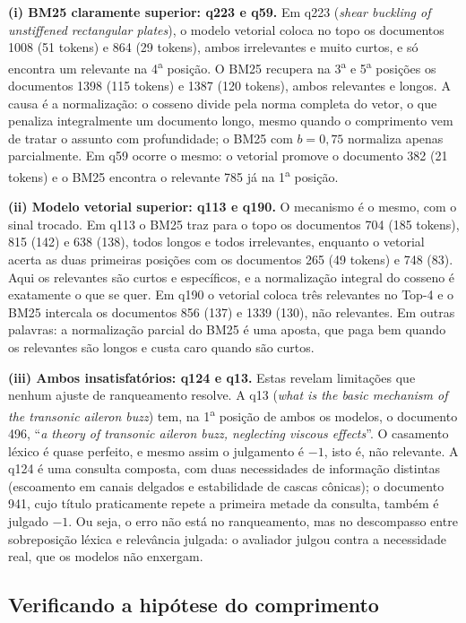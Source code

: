\documentclass[10pt,twocolumn,a4paper]{article}
\begin{document}
\textbf{(i) BM25 claramente superior: q223 e q59.} Em q223 (\textit{shear
buckling of unstiffened rectangular plates}), o modelo vetorial coloca no topo os
documentos 1008 (51 tokens) e 864 (29 tokens), ambos irrelevantes e muito
curtos, e só encontra um relevante na 4\textsuperscript{a} posição. O BM25
recupera na 3\textsuperscript{a} e 5\textsuperscript{a} posições os documentos
1398 (115 tokens) e 1387 (120 tokens), ambos relevantes e longos. A causa é a
normalização: o cosseno divide pela norma completa do vetor, o que penaliza
integralmente um documento longo, mesmo quando o comprimento vem de tratar o
assunto com profundidade; o BM25 com $b = 0{,}75$ normaliza apenas parcialmente.
Em q59 ocorre o mesmo: o vetorial promove o documento 382 (21 tokens) e o BM25
encontra o relevante 785 já na 1\textsuperscript{a} posição.

\textbf{(ii) Modelo vetorial superior: q113 e q190.} O mecanismo é o mesmo, com
o sinal trocado. Em q113 o BM25 traz para o topo os documentos 704 (185 tokens),
815 (142) e 638 (138), todos longos e todos irrelevantes, enquanto o vetorial
acerta as duas primeiras posições com os documentos 265 (49 tokens) e 748 (83).
Aqui os relevantes são curtos e específicos, e a normalização integral do cosseno
é exatamente o que se quer. Em q190 o vetorial coloca três relevantes no Top-4 e
o BM25 intercala os documentos 856 (137) e 1339 (130), não relevantes. Em outras
palavras: a normalização parcial do BM25 é uma aposta, que paga bem quando os
relevantes são longos e custa caro quando são curtos.

\textbf{(iii) Ambos insatisfatórios: q124 e q13.} Estas revelam limitações que
nenhum ajuste de ranqueamento resolve. A q13 (\textit{what is the basic mechanism
of the transonic aileron buzz}) tem, na 1\textsuperscript{a} posição de ambos os
modelos, o documento 496, ``\textit{a theory of transonic aileron buzz,
neglecting viscous effects}''. O casamento léxico é quase perfeito, e mesmo assim
o julgamento é $-1$, isto é, não relevante. A q124 é uma consulta composta, com
duas necessidades de informação distintas (escoamento em canais delgados e
estabilidade de cascas cônicas); o documento 941, cujo título praticamente repete
a primeira metade da consulta, também é julgado $-1$. Ou seja, o erro não está no
ranqueamento, mas no descompasso entre sobreposição léxica e relevância julgada:
o avaliador julgou contra a necessidade real, que os modelos não enxergam.

\subsection{Verificando a hipótese do comprimento}
\label{sec:hip}
\end{document}
